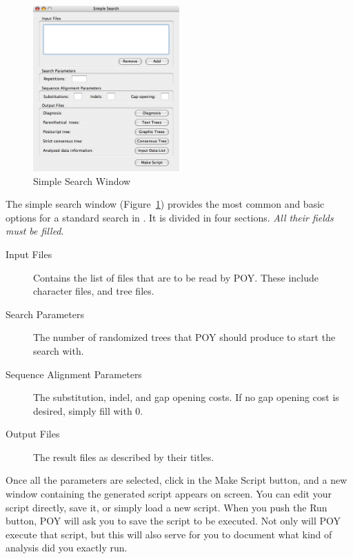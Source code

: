 \begin{figure}[htpb]
    \begin{center}
        \includegraphics[width=0.5\textwidth]{figures/SimpleSearch_Window.jpg}
    \end{center}
    \caption{Simple Search Window}
    \label{fig:simple_search_window}
\end{figure}

The simple search window (Figure~\ref{fig:simple_search_window})
provides the most common and basic options for a standard search
in \poy.  It is divided in four sections. \emph{All their fields
must be filled}.

\begin{description}
    \item[Input Files]
        Contains the list of files that are to be read by POY. These include
        character files, and tree files. 
    \item[Search Parameters]
        The number of randomized trees that POY should produce to start the
        search with.
    \item[Sequence Alignment Parameters]
        The substitution, indel, and gap opening costs. If no gap opening cost
        is desired, simply fill with 0.
    \item[Output Files]
        The result files as described by their titles.
\end{description}

Once all the parameters are selected, click in the Make Script button, and a new
window containing the generated script appears on screen. You can edit your
script directly, save it, or simply load a new script. When you push the Run
button, POY will ask you to save the script to be executed. Not only will POY
execute that script, but this will also serve for you to document what kind of
analysis did you exactly run.


